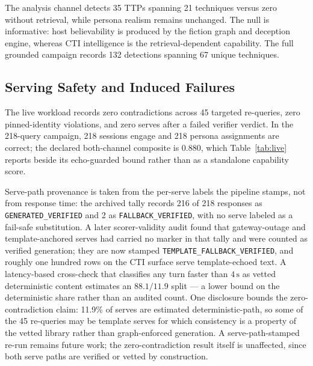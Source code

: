 

The analysis channel detects 35 TTPs spanning 21 techniques versus zero
without retrieval, while persona realism remains unchanged. The null is informative:
host believability is produced by the fiction graph and deception engine,
whereas CTI intelligence is the retrieval-dependent capability. The full
grounded campaign records 132 detections spanning 67 unique techniques.

\subsection{Serving Safety and Induced Failures}
\label{sec:rq2}
The live workload records zero contradictions across 45 targeted re-queries,
zero pinned-identity violations, and zero serves after a failed verifier
verdict. In the 218-query campaign, 218 sessions engage and 218 persona
assignments are correct; the declared both-channel composite is 0.880, which
Table~\ref{tab:live} reports beside its echo-guarded bound rather than as a
standalone capability score.

Serve-path provenance is taken from the per-serve labels the pipeline stamps,
not from response time: the archived tally records 216 of 218 responses as
\texttt{GENERATED\_VERIFIED} and 2 as \texttt{FALLBACK\_VERIFIED}, with no
serve labeled as a fail-safe substitution. A later scorer-validity audit
found that gateway-outage and template-anchored serves had carried no marker
in that tally and were counted as verified generation; they are now stamped
\texttt{TEMPLATE\_FALLBACK\_VERIFIED}, and roughly one hundred rows on the
CTI surface serve template-echoed text. A latency-based cross-check that
classifies any turn faster than $4\,\mathrm{s}$ as vetted deterministic
content estimates an $88.1/11.9$ split --- a lower bound on the deterministic
share rather than an audited count. One disclosure bounds the
zero-contradiction claim: 11.9\% of serves are estimated deterministic-path,
so some of the 45 re-queries may be template serves for which consistency is
a property of the vetted library rather than graph-enforced generation. A
serve-path-stamped re-run remains future work; the zero-contradiction result
itself is unaffected, since both serve paths are verified or vetted by
construction.

